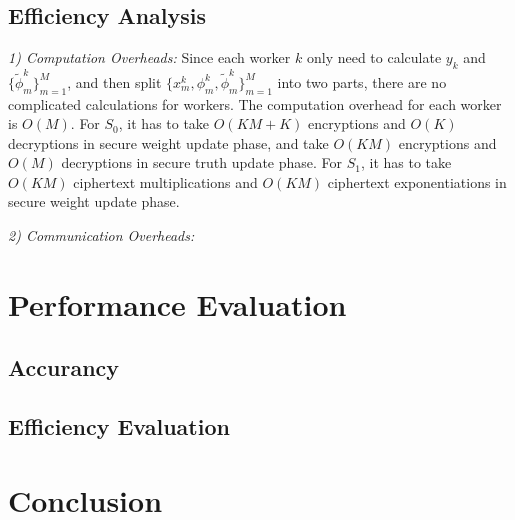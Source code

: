 \documentclass[conference]{IEEEtran}
\begin{document}
\subsection{Efficiency Analysis}
{\em 1) Computation Overheads:} Since each worker $k$ only need to calculate $y_k$ and $\{\tilde{\phi}_m^k\}_{m=1}^M$, and then split $\{x_m^k, \phi_m^k, \tilde{\phi}_m^k\}_{m=1}^M$ into two parts, there are no complicated calculations for workers.
The computation overhead for each worker is $O(M)$.
For $S_0$, it has to take $O(KM+K)$ encryptions and $O(K)$ decryptions in secure weight update phase, and take $O(KM)$ encryptions and $O(M)$ decryptions in secure truth update phase.
For $S_1$, it has to take $O(KM)$ ciphertext multiplications and $O(KM)$ ciphertext exponentiations in secure weight update phase.

{\em 2) Communication Overheads:}

\section{Performance Evaluation}\label{sec7}
\subsection{Accurancy}
\subsection{Efficiency Evaluation}

\section{Conclusion}\label{sec8}




\vspace{12pt}
\end{document}
